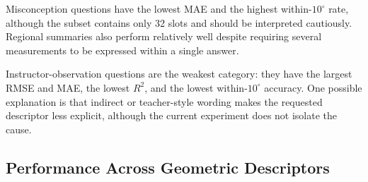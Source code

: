 \begin{table}[t]
    \centering
    \caption{Teacher-forced angle-slot regression grouped by
    geometry-question type.}
    \label{tab:path_results}
\end{table}

Misconception questions have the lowest MAE and the highest
within-$10^\circ$ rate, although the subset contains only 32 slots and
should be interpreted cautiously. Regional summaries also perform
relatively well despite requiring several measurements to be expressed
within a single answer.

Instructor-observation questions are the weakest category: they have
the largest RMSE and MAE, the lowest $R^2$, and the lowest
within-$10^\circ$ accuracy. One possible explanation is that indirect
or teacher-style wording makes the requested descriptor less explicit,
although the current experiment does not isolate the cause.

\subsection{Performance Across Geometric Descriptors}
\label{sec:metric_results}

